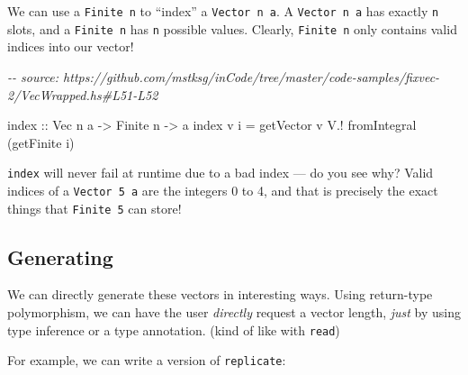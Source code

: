 \documentclass[]{article}
\newenvironment{Shaded}{}{}
\newcommand{\CommentTok}[1]{\textcolor[rgb]{0.38,0.63,0.69}{\textit{#1}}}
\newcommand{\DataTypeTok}[1]{\textcolor[rgb]{0.56,0.13,0.00}{#1}}
\newcommand{\FunctionTok}[1]{\textcolor[rgb]{0.02,0.16,0.49}{#1}}
\newcommand{\KeywordTok}[1]{\textcolor[rgb]{0.00,0.44,0.13}{\textbf{#1}}}
\newcommand{\NormalTok}[1]{#1}
\newcommand{\OperatorTok}[1]{\textcolor[rgb]{0.40,0.40,0.40}{#1}}
\newcommand{\OtherTok}[1]{\textcolor[rgb]{0.00,0.44,0.13}{#1}}
\begin{document}
We can use a \texttt{Finite\ n} to ``index'' a \texttt{Vector\ n\ a}. A
\texttt{Vector\ n\ a} has exactly \texttt{n} slots, and a \texttt{Finite\ n} has
\texttt{n} possible values. Clearly, \texttt{Finite\ n} only contains valid
indices into our vector!

\begin{Shaded}
\begin{Highlighting}[]
\CommentTok{{-}{-} source: https://github.com/mstksg/inCode/tree/master/code{-}samples/fixvec{-}2/VecWrapped.hs\#L51{-}L52}

\FunctionTok{index}\OtherTok{ ::} \DataTypeTok{Vec}\NormalTok{ n a }\OtherTok{{-}>} \DataTypeTok{Finite}\NormalTok{ n }\OtherTok{{-}>}\NormalTok{ a}
\FunctionTok{index}\NormalTok{ v i }\OtherTok{=}\NormalTok{ getVector v }\OperatorTok{V.!} \FunctionTok{fromIntegral}\NormalTok{ (getFinite i)}
\end{Highlighting}
\end{Shaded}

\texttt{index} will never fail at runtime due to a bad index --- do you see why?
Valid indices of a \texttt{Vector\ 5\ a} are the integers 0 to 4, and that is
precisely the exact things that \texttt{Finite\ 5} can store!

\hypertarget{generating}{%
\subsection{Generating}\label{generating}}

We can directly generate these vectors in interesting ways. Using return-type
polymorphism, we can have the user \emph{directly} request a vector length,
\emph{just} by using type inference or a type annotation. (kind of like with
\texttt{read})

For example, we can write a version of \texttt{replicate}:

\begin{Shaded}
\end{Shaded}
\end{document}
